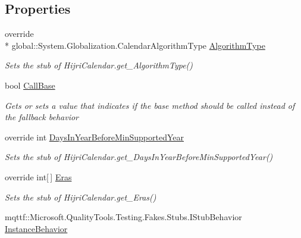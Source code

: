 \subsection*{Properties}
\begin{DoxyCompactItemize}
\item 
override \\*
global\-::\-System.\-Globalization.\-Calendar\-Algorithm\-Type \hyperlink{class_system_1_1_globalization_1_1_fakes_1_1_stub_hijri_calendar_a53b8a06816b3f01933f69bd5f34f079a}{Algorithm\-Type}
\begin{DoxyCompactList}\small\item\em Sets the stub of Hijri\-Calendar.\-get\-\_\-\-Algorithm\-Type()\end{DoxyCompactList}\item 
bool \hyperlink{class_system_1_1_globalization_1_1_fakes_1_1_stub_hijri_calendar_a5ce5f38a7477cad58c23f521998badc2}{Call\-Base}
\begin{DoxyCompactList}\small\item\em Gets or sets a value that indicates if the base method should be called instead of the fallback behavior\end{DoxyCompactList}\item 
override int \hyperlink{class_system_1_1_globalization_1_1_fakes_1_1_stub_hijri_calendar_ad116fbdbf439684cd6f122aec497dbbf}{Days\-In\-Year\-Before\-Min\-Supported\-Year}
\begin{DoxyCompactList}\small\item\em Sets the stub of Hijri\-Calendar.\-get\-\_\-\-Days\-In\-Year\-Before\-Min\-Supported\-Year()\end{DoxyCompactList}\item 
override int\mbox{[}$\,$\mbox{]} \hyperlink{class_system_1_1_globalization_1_1_fakes_1_1_stub_hijri_calendar_ac9923c0566caa458bcf03a667b189697}{Eras}
\begin{DoxyCompactList}\small\item\em Sets the stub of Hijri\-Calendar.\-get\-\_\-\-Eras()\end{DoxyCompactList}\item 
mqttf\-::\-Microsoft.\-Quality\-Tools.\-Testing.\-Fakes.\-Stubs.\-I\-Stub\-Behavior \hyperlink{class_system_1_1_globalization_1_1_fakes_1_1_stub_hijri_calendar_ad74697ec06a3d68a512d434d7598f475}{Instance\-Behavior}

\end{DoxyCompactItemize}
